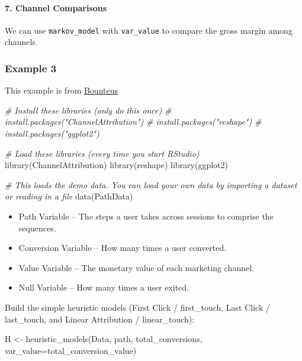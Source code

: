 \documentclass[
]{book}
\newenvironment{Shaded}{\begin{snugshade}}{\end{snugshade}}
\newcommand{\AttributeTok}[1]{\textcolor[rgb]{0.77,0.63,0.00}{#1}}
\newcommand{\CommentTok}[1]{\textcolor[rgb]{0.56,0.35,0.01}{\textit{#1}}}
\newcommand{\FunctionTok}[1]{\textcolor[rgb]{0.00,0.00,0.00}{#1}}
\newcommand{\NormalTok}[1]{#1}
\newcommand{\OtherTok}[1]{\textcolor[rgb]{0.56,0.35,0.01}{#1}}
\newcommand{\StringTok}[1]{\textcolor[rgb]{0.31,0.60,0.02}{#1}}
\providecommand{\tightlist}{%
  \setlength{\itemsep}{0pt}\setlength{\parskip}{0pt}}
\begin{document}
\hypertarget{channel-comparisons}{%
\paragraph{7. Channel Comparisons}\label{channel-comparisons}}

We can use \texttt{markov\_model} with \texttt{var\_value} to compare the gross margin among channels.

\hypertarget{example-3}{%
\subsubsection{Example 3}\label{example-3}}

This example is from
\href{https://www.bounteous.com/insights/2016/06/30/marketing-channel-attribution-markov-models-r/}{Bounteus}

\begin{Shaded}
\begin{Highlighting}[]
\CommentTok{\# Install these libraries (only do this once)}
\CommentTok{\# install.packages("ChannelAttribution")}
\CommentTok{\# install.packages("reshape")}
\CommentTok{\# install.packages("ggplot2")}

\CommentTok{\# Load these libraries (every time you start RStudio)}
\FunctionTok{library}\NormalTok{(ChannelAttribution)}
\FunctionTok{library}\NormalTok{(reshape)}
\FunctionTok{library}\NormalTok{(ggplot2)}

\CommentTok{\# This loads the demo data. You can load your own data by importing a dataset or reading in a file}
\FunctionTok{data}\NormalTok{(PathData)}
\end{Highlighting}
\end{Shaded}

\begin{itemize}
\tightlist
\item
  Path Variable -- The steps a user takes across sessions to comprise the sequences.
\item
  Conversion Variable -- How many times a user converted.
\item
  Value Variable -- The monetary value of each marketing channel.
\item
  Null Variable -- How many times a user exited.
\end{itemize}

Build the simple heuristic models (First Click / first\_touch, Last Click / last\_touch, and Linear Attribution /
linear\_touch):

\begin{Shaded}
\begin{Highlighting}[]
\NormalTok{H }\OtherTok{\textless{}{-}} \FunctionTok{heuristic\_models}\NormalTok{(Data, }\StringTok{\textquotesingle{}path\textquotesingle{}}\NormalTok{, }\StringTok{\textquotesingle{}total\_conversions\textquotesingle{}}\NormalTok{, }\AttributeTok{var\_value=}\StringTok{\textquotesingle{}total\_conversion\_value\textquotesingle{}}\NormalTok{)}
\end{Highlighting}
\end{Shaded}
\end{document}
